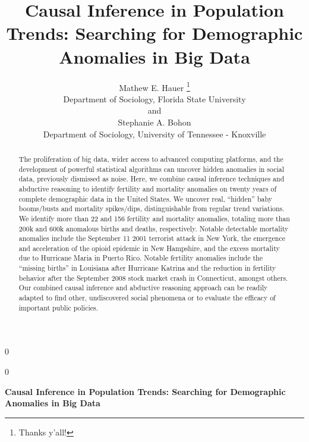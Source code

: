 \documentclass[12pt]{article}
\newcommand{\blind}{0}
\begin{document}
\def\spacingset#1{\renewcommand{\baselinestretch}%
{#1}\small\normalsize} \spacingset{1}



\blind
{
  \title{\bf Causal Inference in Population Trends: Searching for Demographic
Anomalies in Big Data}

  \author{
        Mathew E. Hauer \thanks{Thanks y'all!} \\
    Department of Sociology, Florida State University\\
     and \\     Stephanie A. Bohon \\
    Department of Sociology, University of Tennessee - Knoxville\\
      }
  \maketitle
} \fi

\blind
{
  \bigskip
  \bigskip
  \bigskip
  \begin{center}
    {\LARGE\bf Causal Inference in Population Trends: Searching for Demographic
Anomalies in Big Data}
  \end{center}
  \medskip
} \fi

\bigskip
\begin{abstract}
The proliferation of big data, wider access to advanced computing
platforms, and the development of powerful statistical algorithms can
uncover hidden anomalies in social data, previously dismissed as noise.
Here, we combine causal inference techniques and abductive reasoning to
identify fertility and mortality anomalies on twenty years of complete
demographic data in the United States. We uncover real, ``hidden'' baby
booms/busts and mortality spikes/dips, distinguishable from regular
trend variations. We identify more than 22 and 156 fertility and
mortality anomalies, totaling more than 200k and 600k anomalous births
and deaths, respectively. Notable detectable mortality anomalies include
the September 11 2001 terrorist attack in New York, the emergence and
acceleration of the opioid epidemic in New Hampshire, and the excess
mortality due to Hurricane Maria in Puerto Rico. Notable fertility
anomalies include the ``missing births'' in Louisiana after Hurricane
Katrina and the reduction in fertility behavior after the September 2008
stock market crash in Connecticut, amongst others. Our combined causal
inference and abductive reasoning approach can be readily adapted to
find other, undiscovered social phenomena or to evaluate the efficacy of
important public policies.
\end{abstract}
\end{document}
